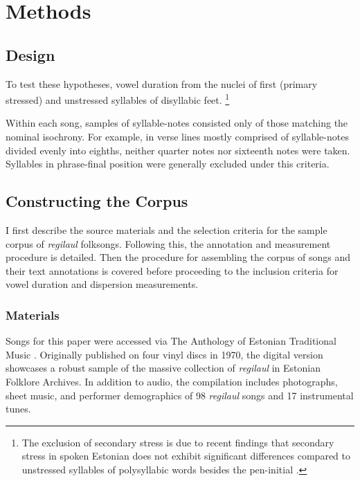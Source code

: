 \chapter{Methods}
%

\section{Design}
To test these hypotheses, vowel duration from the nuclei of first (primary stressed) and unstressed syllables of disyllabic feet. \footnote{The exclusion of secondary stress is due to recent findings that secondary stress in spoken Estonian does not exhibit significant differences compared to unstressed syllables of polysyllabic words besides the pen-initial \cite{asuLippus2018}. }

Within each song, samples of syllable-notes consisted only of those matching the nominal isochrony. For example, in verse lines mostly comprised of syllable-notes divided evenly into eighths, neither quarter notes nor sixteenth notes were taken. Syllables in phrase-final position were generally excluded under this criteria. 


\section{Constructing the Corpus}

I first describe the source materials and the selection criteria for the sample corpus of {\it regilaul} folksongs. Following this, the annotation and measurement procedure is detailed. Then the procedure for assembling the corpus of songs and their text annotations is covered before proceeding to the inclusion criteria for vowel duration and dispersion measurements.

\subsection{Materials}

Songs for this paper were accessed via The Anthology of Estonian Traditional Music \citep{tampere2016}. Originally published on four vinyl discs in 1970, the digital version showcases a robust sample of the massive collection of {\it regilaul} in Estonian Folklore Archives. In addition to audio, the  compilation includes  photographs, sheet music, and performer demographics of 98 {\it regilaul} songs and 17 instrumental tunes. 

